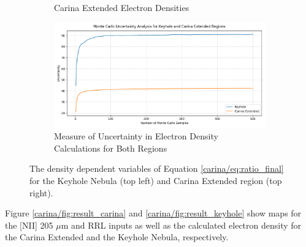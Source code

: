 \begin{figure}
\begin{subfigure}[t]{0.45\textwidth}
        \caption{Carina Extended Electron Densities}
        \label{carina/fig:calculations_carina}
    \end{subfigure}
    \begin{subfigure}[t]{\textwidth}
        \centering
        \includegraphics[width=\textwidth]{figs/carina/monte_carlo.png}
        \caption{Measure of Uncertainty in Electron Density Calculations for Both Regions}
        \label{carina/fig:monte_carlo}
    \end{subfigure}
    \caption[Density Dependent Variables for Electron Density Calculations and Monte Carlo Simulation]{
        The density dependent variables of Equation \ref{carina/eq:ratio_final} for the Keyhole Nebula (top left) and Carina Extended region (top right).
        }
    \label{carina/fig:calculations}
\end{figure}

Figure \ref{carina/fig:result_carina} and \ref{carina/fig:result_keyhole} show maps for the [NII] 205 $\mu$m and RRL inputs as well as the calculated electron density for the Carina Extended and the Keyhole Nebula, respectively.

